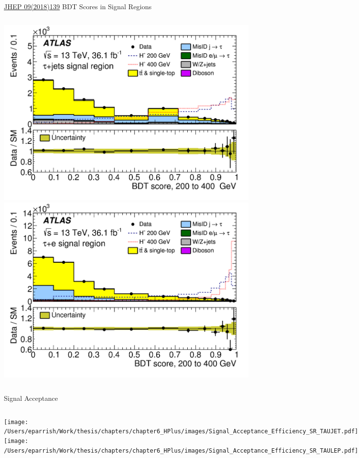 \documentclass[aspectratio=169,xcolor=table]{beamer}
\begin{document}
\begin{frame}[t]{\href{https://link.springer.com/article/10.1007/JHEP09(2018)139}{JHEP 09(2018)139} BDT Scores in Signal Regions}
\begin{columns}[t]
      \includegraphics[height=.4\textheight,keepaspectratio=true]{taujet_SR_2018/taujet_SR_200to400_2018.png}
      \includegraphics[height=.4\textheight,keepaspectratio=true]{tauel_SR_2018/tauel_SR_200to400_2018.png}


    \end{columns}
  \end{frame}

  \begin{frame}[c]{Signal Acceptance}
    \begin{columns}[c]
      \texttt{[image: /Users/eparrish/Work/thesis/chapters/chapter6\_HPlus/images/Signal\_Acceptance\_Efficiency\_SR\_TAUJET.pdf]}
      \texttt{[image: /Users/eparrish/Work/thesis/chapters/chapter6\_HPlus/images/Signal\_Acceptance\_Efficiency\_SR\_TAULEP.pdf]}
    \end{columns}
  \end{frame}
\end{document}
